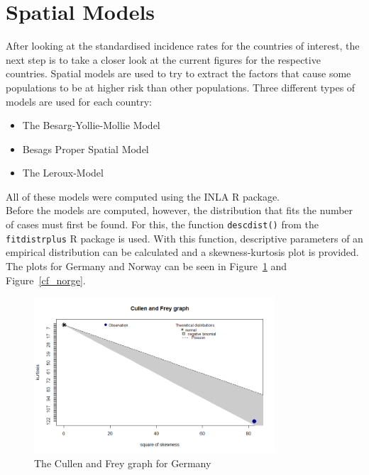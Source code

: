 \section{Spatial Models}
After looking at the standardised incidence rates for the countries of interest, the next step is to take a closer look at the current figures for the respective countries. Spatial models are used to try to extract the factors that cause some populations to be at higher risk than other populations. Three different types of models are used for each country:
\begin{itemize}
    \item[1.] The Besarg-Yollie-Mollie Model
    \item[2.] Besags Proper Spatial Model
    \item[3.] The Leroux-Model
\end{itemize}
All of these models were computed using the INLA \cite{rinla} R package. \\
Before the models are computed, however, the distribution that fits the number of cases must first be found. For this, the function \texttt{descdist()} from the \texttt{fitdistrplus} R package is used. With this function, descriptive parameters of an empirical distribution can be calculated and a skewness-kurtosis plot is provided. The plots for Germany and Norway can be seen in Figure~\ref{cf_germany} and Figure~\ref{cf_norge}.
%     
\begin{figure}[H]
    \centering
    \includegraphics[width = 0.8\textwidth]{cf-germany.png}
    \caption{The Cullen and Frey graph for Germany}
    \label{cf_germany}
\end{figure}
